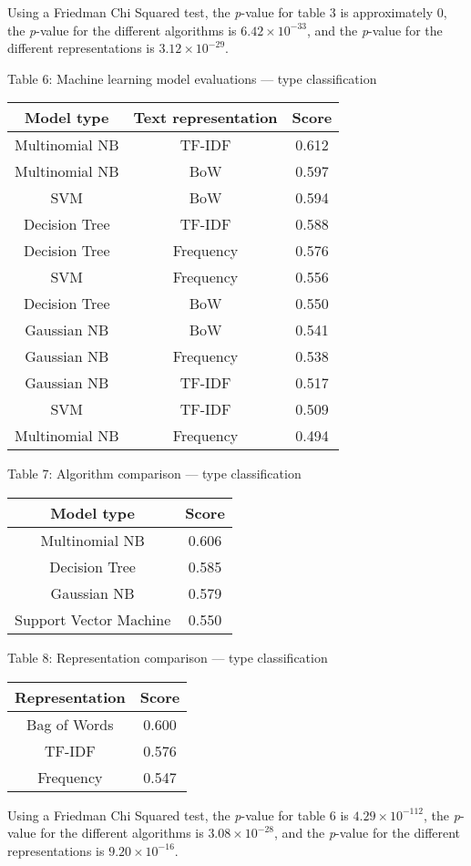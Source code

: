 \documentclass{article}
\begin{document}
Using a Friedman Chi Squared test, the \emph{p}-value for table 3 is approximately 0, the \emph{p}-value for the different algorithms is $6.42 \times 10^{-33}$, and the \emph{p}-value for the different representations is $3.12 \times 10^{-29}$.

\begin{center}
Table 6: Machine learning model evaluations --- type classification\\
\begin{tabular}{ |c|c|c| }
\hline {\bf Model type} & {\bf Text representation} & {\bf Score} \\
\hline Multinomial NB & TF-IDF & 0.612\\
\hline Multinomial NB & BoW & 0.597\\
\hline SVM & BoW & 0.594\\
\hline Decision Tree & TF-IDF & 0.588\\
\hline Decision Tree & Frequency & 0.576\\
\hline SVM & Frequency & 0.556\\
\hline Decision Tree & BoW & 0.550\\
\hline Gaussian NB & BoW & 0.541\\
\hline Gaussian NB & Frequency & 0.538\\
\hline Gaussian NB & TF-IDF & 0.517\\
\hline SVM & TF-IDF & 0.509\\
\hline Multinomial NB & Frequency & 0.494\\
\hline
\end{tabular}
\end{center}

\begin{center}
Table 7: Algorithm comparison --- type classification\\
\begin{tabular}{ |c|c| }
\hline {\bf Model type}& {\bf Score}\\
\hline Multinomial NB & 0.606\\
\hline Decision Tree & 0.585\\
\hline Gaussian NB & 0.579\\
\hline Support Vector Machine & 0.550\\
\hline
\end{tabular}
\end{center}

\begin{center}
Table 8: Representation comparison --- type classification\\
\begin{tabular}{ |c|c| }
\hline {\bf Representation}& {\bf Score}\\
\hline Bag of Words & 0.600\\
\hline TF-IDF & 0.576\\
\hline Frequency & 0.547\\
\hline
\end{tabular}
\end{center}

Using a Friedman Chi Squared test, the \emph{p}-value for table 6 is $4.29 \times 10^{-112}$, the \emph{p}-value for the different algorithms is $3.08 \times 10^{-28}$, and the \emph{p}-value for the different representations is $9.20 \times 10^{-16}$.
\end{document}
